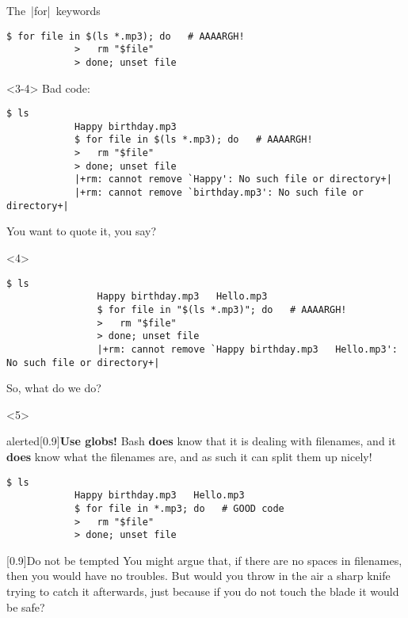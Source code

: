 \begin{frame}[fragile]{The \,\bash|for|\, keywords}
\begin{onlyenv}
\begin{lstlisting}[style=MyBash, xrightmargin=4mm]
            $ for file in $(ls *.mp3); do   # AAAARGH!
            >   rm "$file"
            > done; unset file
        \end{lstlisting}
    \end{onlyenv}
    \begin{onlyenv}<3-4>
        \vspace{-3mm}
        Bad code:
        \medskip
        \begin{lstlisting}[style=MyBash, xrightmargin=4mm]
            $ ls
            Happy birthday.mp3
            $ for file in $(ls *.mp3); do   # AAAARGH!
            >   rm "$file"
            > done; unset file
            |+rm: cannot remove `Happy': No such file or directory+|
            |+rm: cannot remove `birthday.mp3': No such file or directory+|
        \end{lstlisting}
        \medskip
        You want to quote it, you say?
        \medskip
        \begin{onlyenv}<4>
            \begin{lstlisting}[style=MyBash, xrightmargin=4mm]
                $ ls
                Happy birthday.mp3   Hello.mp3
                $ for file in "$(ls *.mp3)"; do   # AAAARGH!
                >   rm "$file"
                > done; unset file
                |+rm: cannot remove `Happy birthday.mp3   Hello.mp3': No such file or directory+|
            \end{lstlisting}
            \medskip
            So, what do we do?
        \end{onlyenv}
    \end{onlyenv}
    \begin{onlyenv}<5>
        \vspace{-2mm}
        \begin{varblock}{alerted}[0.9\textwidth]{\textbf{Use globs!}}
            Bash \textbf{does} know that it is dealing with filenames, and it \textbf{does} know what the filenames are, and as such it can split them up nicely!
        \end{varblock}
        \medskip
        \begin{lstlisting}[style=MyBash, xrightmargin=4mm]
            $ ls
            Happy birthday.mp3   Hello.mp3
            $ for file in *.mp3; do   # GOOD code
            >   rm "$file"
            > done; unset file
        \end{lstlisting}
        \medskip
        \begin{varblock}{}[0.9\textwidth]{Do not be tempted}
            You might argue that, if there are no spaces in filenames, then you would have no troubles.
            But would you throw in the air a sharp knife trying to catch it afterwards, just because if you do not touch the blade it would be safe?
        \end{varblock}
    \end{onlyenv}
\end{frame}







